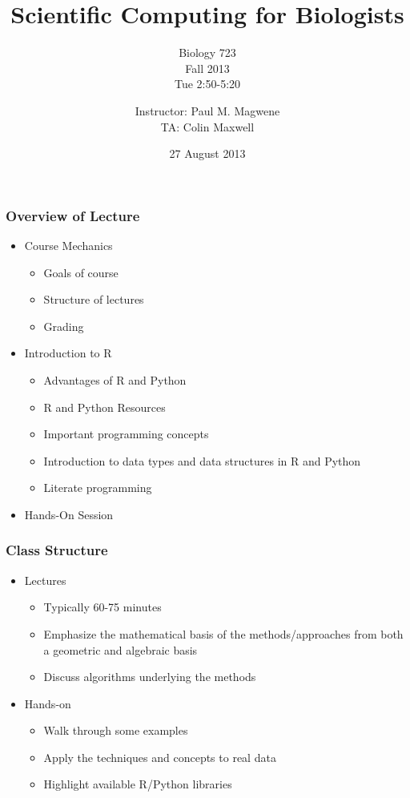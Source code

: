 \documentclass{beamer}
\title{Scientific Computing for Biologists}
\subtitle{Biology 723\\
Fall 2013\\
Tue 2:50-5:20
}
\author[P. Magwene]{Instructor: Paul M. Magwene\\
                    TA: Colin Maxwell}
\institute[Bio 723]{
Email: paul.magwene@duke.edu\\
Phone: 613-8159
}
\date{27 August 2013}
\begin{document}
\begin{frame}
\titlepage
\end{frame}

\begin{frame}
  \frametitle{Overview of Lecture}

\begin{itemize}
		\item Course Mechanics
		\begin{itemize}
			\item Goals of course
			\item Structure of lectures
			\item Grading
		\end{itemize}
		\item Introduction to R
		\begin{itemize}
			\item Advantages of R and Python
			\item R and Python Resources
			\item Important programming concepts
			\item Introduction to data types and data structures in R and Python
			\item Literate programming
		\end{itemize}
		\item Hands-On Session
\end{itemize}

\end{frame}


\begin{frame}
  \frametitle{Class Structure}
\begin{itemize}
	\item Lectures

		\begin{itemize}
			\item Typically 60-75 minutes
			\item Emphasize the mathematical basis of the methods/approaches from both a geometric and algebraic basis
			\item Discuss algorithms underlying the methods
		\end{itemize}

	\item Hands-on

			\begin{itemize}
				\item Walk through some examples
				\item Apply the techniques and concepts to real data
				\item Highlight available R/Python libraries
			\end{itemize}

\end{itemize}

\end{frame}
\end{document}
